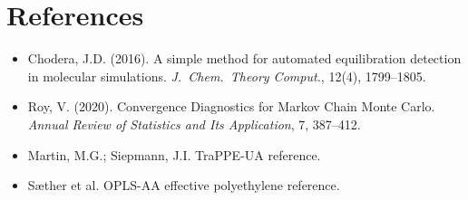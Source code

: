 
\section*{References}

\begin{itemize}
  \item Chodera, J.D. (2016). A simple method for automated equilibration
        detection in molecular simulations.
        \textit{J.\ Chem.\ Theory Comput.}, 12(4), 1799--1805.

  \item Roy, V. (2020). Convergence Diagnostics for Markov Chain Monte
        Carlo. \textit{Annual Review of Statistics and Its Application},
        7, 387--412.

  \item Martin, M.G.; Siepmann, J.I. TraPPE-UA reference.

  \item S{\ae}ther et al. OPLS-AA effective polyethylene reference.
\end{itemize}